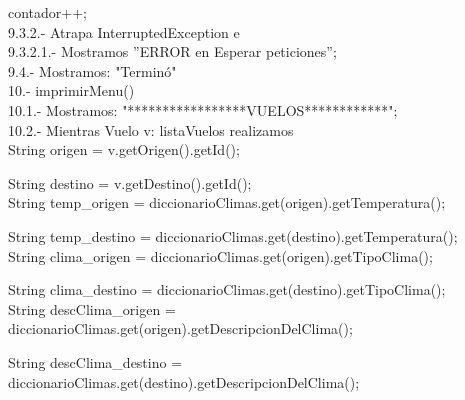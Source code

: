 \documentclass[30pt]{article}
\theoremstyle{definition}
\begin{document}
  \hspace{3cm} contador++;\\

    \hspace{3cm}9.3.2.- Atrapa InterruptedException e\\
    
    \hspace{4cm}9.3.2.1.- Mostramos ''ERROR en Esperar peticiones'';\\
    
    \hspace{2cm} 9.4.- Mostramos: "Terminó"\\
    
    \hspace{1cm} 10.- imprimirMenu()\\
    
    \hspace{2cm} 10.1.- Mostramos: "*****************VUELOS************";\\
    
    \hspace{2cm} 10.2.- Mientras Vuelo v: listaVuelos realizamos\\
    
    \hspace{3cm} String origen = v.getOrigen().getId();
    
  \hspace{3cm} String destino = v.getDestino().getId();\\

  \hspace{3cm} String temp\_origen = diccionarioClimas.get(origen).getTemperatura();
  
  \hspace{3cm} String temp\_destino = diccionarioClimas.get(destino).getTemperatura();\\

  \hspace{3cm} String clima\_origen = diccionarioClimas.get(origen).getTipoClima();
  
  \hspace{3cm} String clima\_destino = diccionarioClimas.get(destino).getTipoClima();\\

  \hspace{3cm} String descClima\_origen = diccionarioClimas.get(origen).getDescripcionDelClima();
  
  \hspace{3cm} String descClima\_destino = diccionarioClimas.get(destino).getDescripcionDelClima();\\
\end{document}
